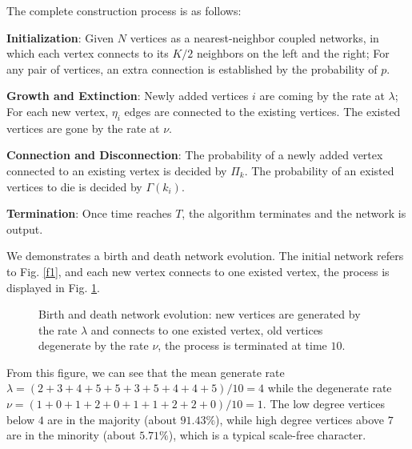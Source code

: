 \documentclass[final]{IEEEtran}
\begin{document}
The complete construction process is as follows:

\textbf{Initialization}: Given $N$ vertices as a nearest-neighbor
coupled networks, in which each vertex connects to its $K/2$
neighbors on the left and the right; For any pair of vertices, an
extra connection is established by the probability of $p$.


\textbf{Growth and Extinction}: Newly added vertices $i$ are
coming by the rate at $\lambda$; For each new vertex, $\eta_{i}$
edges are connected to the existing vertices. The existed vertices
are gone by the rate at $\nu$.

\textbf{Connection and Disconnection}: The probability of a newly
added vertex connected to an existing vertex is decided by
$\Pi_{k}$. The probability of an existed vertices to die is
decided by $\Gamma(k_{i})$.

\textbf{Termination}: Once time reaches $T$, the algorithm
terminates and the network is output.



We demonstrates a birth and death network evolution. The initial
network refers to Fig. \ref{f1}, and each new vertex connects to
one existed vertex, the process is displayed in Fig. \ref{f5}.

\begin{figure}[!htp]
\centering
\caption{\label{f5} Birth and death network evolution: new
vertices are generated by the rate $\lambda $ and connects to one
existed vertex, old vertices degenerate by the rate $\nu$, the
process is terminated at time $10$.}
\end{figure}


From this figure, we can see that the mean generate rate
$\lambda=(2+3+4+5+5+3+5+4+4+5)/10$$=$$4$ while the degenerate rate
$\nu=(1+0+1+2+0+1+1+2+2+0)/10$$=$$1$. The low degree vertices
below $4$ are in the majority (about $91.43\%$), while high degree
vertices above $7$ are in the minority (about $5.71\%$), which is
a typical scale-free character.
\end{document}
